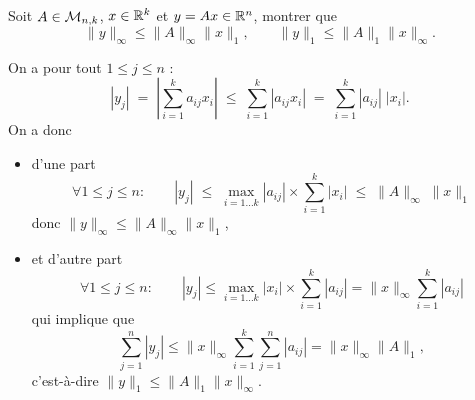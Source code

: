 \begin{proposition} \label{prop:normeProduitMatriceVecteur}
  Soit $A \in \mathcal{M}_{n, k}$, $x \in \mathbb{R}^k$ et $y = Ax \in \mathbb{R}^n$, montrer que 
  $$
  \|y\|_\infty \leq \|A\|_\infty \|x\|_1, \qquad
  \|y\|_1 \leq \|A\|_1 \|x\|_\infty.
  $$
\end{proposition}

\proof On a pour tout $1 \leq j \leq n$ :
$$
|y_j| 
\; = \; \left|\sum_{i=1}^k a_{ij} x_i \right| 
\; \leq \; \sum_{i=1}^k |a_{ij} x_i| 
\; = \; \sum_{i=1}^k |a_{ij}| \; |x_i|.
$$
On a donc
\begin{itemize}
  \item d'une part
  $$
  \forall 1 \leq j \leq n: \qquad |y_j| 
  \; \leq \; \max_{i=1 \dots k} |a_{ij}| \times \sum_{i=1}^k |x_i| 
  \; \leq \; \|A\|_\infty \; \|x\|_1
  $$
  donc $\|y\|_\infty \leq \|A\|_\infty \|x\|_1$,
  \item et d'autre part
  $$
  \forall 1 \leq j \leq n: \qquad |y_j| 
  \leq \max_{i=1 \dots k} |x_i| \times \sum_{i=1}^k |a_{ij}| = \|x\|_\infty \sum_{i=1}^k |a_{ij}| 
  $$
  qui implique que
  $$
  \sum_{j=1}^n |y_j| 
  \leq \|x\|_\infty \sum_{i=1}^k \sum_{j=1}^n |a_{ij}| = \|x\|_\infty \|A\|_1,
  $$
  c'est-à-dire $\|y\|_1 \leq \|A\|_1 \|x\|_\infty$.
\end{itemize}
\eproof

